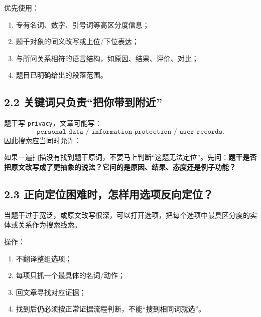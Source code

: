 \documentclass[11pt,a4paper]{ctexart}
\newcommand{\kw}[1]{\textbf{#1}}
\begin{document}
优先使用：
\begin{enumerate}
  \item 专有名词、数字、引号词等高区分度信息；
  \item 题干对象的同义改写或上位/下位表达；
  \item 与所问关系相符的语言结构，如原因、结果、评价、对比；
  \item 题目已明确给出的段落范围。
\end{enumerate}

\subsection{2.2 关键词只负责“把你带到附近”}
题干写 \texttt{privacy}，文章可能写：
\[
\texttt{personal data / information protection / user records}.
\]
因此搜索应当同时允许：
\begin{center}
\end{center}

\begin{warn}[定位失败的常见原因]
如果一遍扫描没有找到题干原词，不要马上判断“这题无法定位”。先问：\kw{题干是否把原文改写成了更抽象的说法？它问的是原因、结果、态度还是例子功能？}
\end{warn}

\subsection{2.3 正向定位困难时，怎样用选项反向定位？}
当题干过于宽泛，或原文改写很深，可以打开选项，把每个选项中最具区分度的实体或关系作为搜索线索。

操作：
\begin{enumerate}
  \item 不翻译整组选项；
  \item 每项只抓一个最具体的名词/动作；
  \item 回文章寻找对应证据；
  \item 找到后仍必须按正常证据流程判断，不能“搜到相同词就选”。
\end{enumerate}
\end{document}
